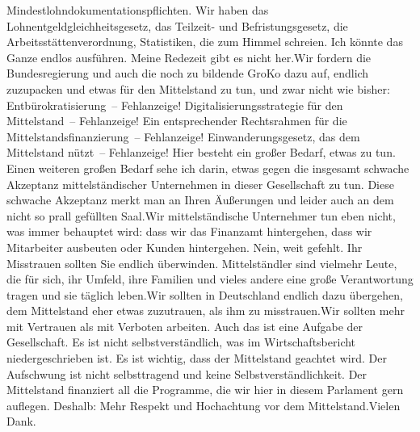 \documentclass{article}
\begin{document}
Mindestlohndokumentationspflichten. Wir haben das Lohnentgeldgleichheitsgesetz, das Teilzeit- und Befristungsgesetz, die Arbeitsstättenverordnung, Statistiken, die zum Himmel schreien. Ich könnte das Ganze endlos ausführen. Meine Redezeit gibt es nicht her.Wir fordern die Bundesregierung und auch die noch zu bildende GroKo dazu auf, endlich zuzupacken und etwas für den Mittelstand zu tun, und zwar nicht wie bisher: Entbürokratisierung – Fehlanzeige! Digitalisierungsstrategie für den Mittelstand – Fehlanzeige! Ein entsprechender Rechtsrahmen für die Mittelstandsfinanzierung – Fehlanzeige! Einwanderungsgesetz, das dem Mittelstand nützt – Fehlanzeige! Hier besteht ein großer Bedarf, etwas zu tun. Einen weiteren großen Bedarf sehe ich darin, etwas gegen die insgesamt schwache Akzeptanz mittelständischer Unternehmen in dieser Gesellschaft zu tun. Diese schwache Akzeptanz merkt man an Ihren Äußerungen und leider auch an dem nicht so prall gefüllten Saal.Wir mittelständische Unternehmer tun eben nicht, was immer behauptet wird: dass wir das Finanzamt hintergehen, dass wir Mitarbeiter ausbeuten oder Kunden hintergehen. Nein, weit gefehlt. Ihr Misstrauen sollten Sie endlich überwinden. Mittelständler sind vielmehr Leute, die für sich, ihr Umfeld, ihre Familien und vieles andere eine große Verantwortung tragen und sie täglich leben.Wir sollten in Deutschland endlich dazu übergehen, dem Mittelstand eher etwas zuzutrauen, als ihm zu misstrauen.Wir sollten mehr mit Vertrauen als mit Verboten arbeiten. Auch das ist eine Aufgabe der Gesellschaft. Es ist nicht selbstverständlich, was im Wirtschaftsbericht niedergeschrieben ist. Es ist wichtig, dass der Mittelstand geachtet wird. Der Aufschwung ist nicht selbsttragend und keine Selbstverständlichkeit. Der Mittelstand finanziert all die Programme, die wir hier in diesem Parlament gern auflegen. Deshalb: Mehr Respekt und Hochachtung vor dem Mittelstand.Vielen Dank.
\end{document}

